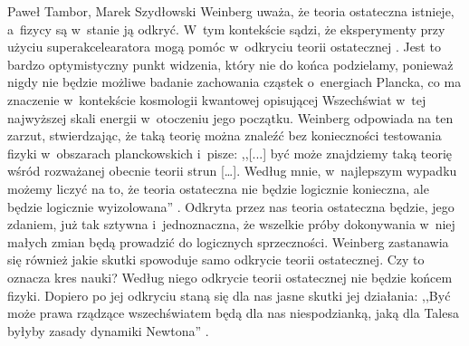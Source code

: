 \begin{artplenv}{Paweł Tambor, Marek Szydłowski}
Weinberg uważa, że teoria ostateczna istnieje, a~fizycy są w~stanie ją odkryć. W~tym kontekście sądzi, że eksperymenty przy użyciu superakcelearatora mogą pomóc w~odkryciu teorii ostatecznej
\parencite[][s.~186]{weinberg_sen_1992}. %
 Jest to bardzo optymistyczny punkt widzenia, który nie do końca podzielamy, ponieważ nigdy nie będzie możliwe badanie zachowania cząstek o~energiach Plancka, co ma znaczenie w~kontekście kosmologii kwantowej opisującej Wszechświat w~tej najwyższej skali energii w~otoczeniu jego początku. Weinberg odpowiada na ten zarzut, stwierdzając, że taką teorię można znaleźć bez konieczności testowania fizyki w~obszarach planckowskich i~pisze: ,,[...] być może znajdziemy taką teorię wśród rozważanej obecnie teorii strun […]. Według mnie, w~najlepszym wypadku możemy liczyć na to, że teoria ostateczna nie będzie logicznie konieczna, ale będzie logicznie wyizolowana'' 
\parencite[][s.~187]{weinberg_sen_1992}. %
 Odkryta przez nas teoria ostateczna będzie, jego zdaniem, już tak sztywna i~jednoznaczna, że wszelkie próby dokonywania w~niej małych zmian będą prowadzić do logicznych sprzeczności. Weinberg zastanawia się również jakie skutki spowoduje samo odkrycie teorii ostatecznej. Czy to oznacza kres nauki? Według niego odkrycie teorii ostatecznej nie będzie końcem fizyki. Dopiero po jej odkryciu staną się dla nas jasne skutki jej działania: ,,Być może prawa rządzące wszechświatem będą dla nas niespodzianką, jaką dla Talesa byłyby zasady dynamiki Newtona'' 
\parencite[][s.~190]{weinberg_sen_1992}.%



\end{artplenv}
